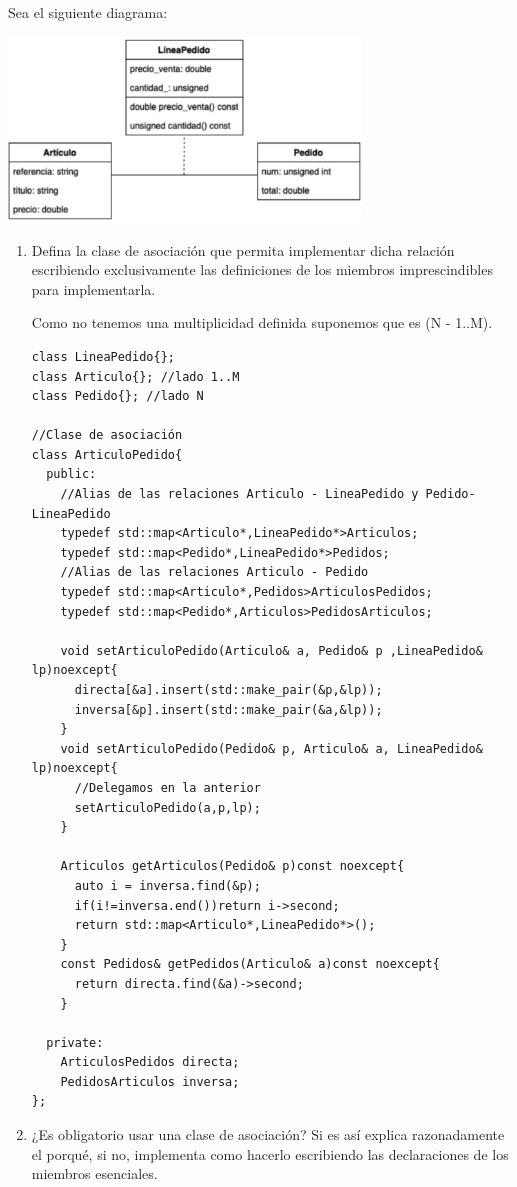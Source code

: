  Sea el siguiente diagrama:
\begin{center}
  \includegraphics[width=0.7\textwidth]{assets/Febrero2023_1.png}
\end{center}
\begin{enumerate}[label = \alph*)]
  \item Defina la clase de asociación que permita implementar dicha relación escribiendo exclusivamente las definiciones de los miembros imprescindibles para implementarla.
  
  Como no tenemos una multiplicidad definida suponemos que es (N - 1..M).
\begin{verbatim}
class LineaPedido{};
class Articulo{}; //lado 1..M
class Pedido{}; //lado N

//Clase de asociación
class ArticuloPedido{
  public: 
    //Alias de las relaciones Articulo - LineaPedido y Pedido-LineaPedido
    typedef std::map<Articulo*,LineaPedido*>Articulos;
    typedef std::map<Pedido*,LineaPedido*>Pedidos;
    //Alias de las relaciones Articulo - Pedido
    typedef std::map<Articulo*,Pedidos>ArticulosPedidos;
    typedef std::map<Pedido*,Articulos>PedidosArticulos;

    void setArticuloPedido(Articulo& a, Pedido& p ,LineaPedido& lp)noexcept{
      directa[&a].insert(std::make_pair(&p,&lp));
      inversa[&p].insert(std::make_pair(&a,&lp));
    }
    void setArticuloPedido(Pedido& p, Articulo& a, LineaPedido& lp)noexcept{
      //Delegamos en la anterior
      setArticuloPedido(a,p,lp);
    }

    Articulos getArticulos(Pedido& p)const noexcept{
      auto i = inversa.find(&p);
      if(i!=inversa.end())return i->second;
      return std::map<Articulo*,LineaPedido*>();
    }
    const Pedidos& getPedidos(Articulo& a)const noexcept{
      return directa.find(&a)->second;
    }

  private:    
    ArticulosPedidos directa;
    PedidosArticulos inversa;
};
\end{verbatim}
  \item ¿Es obligatorio usar una clase de asociación? Si es así explica razonadamente el porqué, si no, implementa como hacerlo escribiendo las declaraciones de los miembros esenciales.
  

\end{enumerate}
